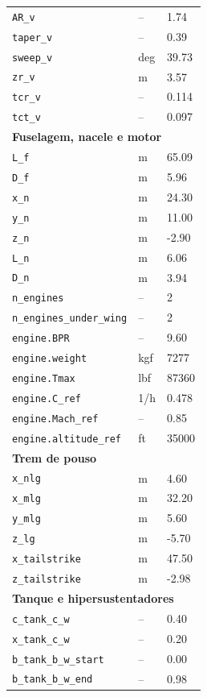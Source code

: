 \begin{longtable}{lll}
\texttt{AR\_v} & -- & 1.74 \\
\texttt{taper\_v} & -- & 0.39 \\
\texttt{sweep\_v} & deg & 39.73 \\
\texttt{zr\_v} & m & 3.57 \\
\texttt{tcr\_v} & -- & 0.114 \\
\texttt{tct\_v} & -- & 0.097 \\
\midrule
\multicolumn{3}{l}{\textbf{Fuselagem, nacele e motor}} \\
\midrule
\texttt{L\_f} & m & 65.09 \\
\texttt{D\_f} & m & 5.96 \\
\texttt{x\_n} & m & 24.30 \\
\texttt{y\_n} & m & 11.00 \\
\texttt{z\_n} & m & -2.90 \\
\texttt{L\_n} & m & 6.06 \\
\texttt{D\_n} & m & 3.94 \\
\texttt{n\_engines} & -- & 2 \\
\texttt{n\_engines\_under\_wing} & -- & 2 \\
\texttt{engine.BPR} & -- & 9.60 \\
\texttt{engine.weight} & kgf & 7277 \\
\texttt{engine.Tmax} & lbf & 87360 \\
\texttt{engine.C\_ref} & 1/h & 0.478 \\
\texttt{engine.Mach\_ref} & -- & 0.85 \\
\texttt{engine.altitude\_ref} & ft & 35000 \\
\midrule
\multicolumn{3}{l}{\textbf{Trem de pouso}} \\
\midrule
\texttt{x\_nlg} & m & 4.60 \\
\texttt{x\_mlg} & m & 32.20 \\
\texttt{y\_mlg} & m & 5.60 \\
\texttt{z\_lg} & m & -5.70 \\
\texttt{x\_tailstrike} & m & 47.50 \\
\texttt{z\_tailstrike} & m & -2.98 \\
\midrule
\multicolumn{3}{l}{\textbf{Tanque e hipersustentadores}} \\
\midrule
\texttt{c\_tank\_c\_w} & -- & 0.40 \\
\texttt{x\_tank\_c\_w} & -- & 0.20 \\
\texttt{b\_tank\_b\_w\_start} & -- & 0.00 \\
\texttt{b\_tank\_b\_w\_end} & -- & 0.98 \\

\end{longtable}
